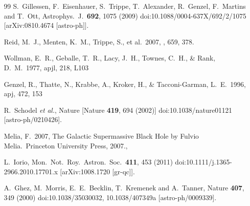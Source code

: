 \documentclass[prd, amsfonts, twocolumn, nofootinbib, showpacs]{revtex4}
\begin{document}
\begin{thebibliography}{99}
  S.~Gillessen, F.~Eisenhauer, S.~Trippe, T.~Alexander, R.~Genzel, F.~Martins and T.~Ott,
  Astrophys.\ J.\  {\bf 692}, 1075 (2009)
  doi:10.1088/0004-637X/692/2/1075
  [arXiv:0810.4674 [astro-ph]].


 Reid, M.~J., Menten, K.~M., Trippe, S., et al.\ 2007, \apj, 659, 378.



 Wollman, E.~R., Geballe, T.~R., Lacy, J.~H., Townes, C.~H., \& Rank, D.~M.\ 1977, apjl, 218, L103


 Genzel, R., Thatte, N., Krabbe, A., Kroker, H., \& Tacconi-Garman, L.~E.\ 1996, apj, 472, 153

  R.~Schodel {\it et al.},
  Nature
  [Nature {\bf 419}, 694 (2002)]
  doi:10.1038/nature01121
  [astro-ph/0210426].

   Melia, F.\ 2007, The Galactic Supermassive Black Hole by Fulvio Melia.~Princeton University Press, 2007.,



  L.~Iorio,
  Mon.\ Not.\ Roy.\ Astron.\ Soc.\  {\bf 411}, 453 (2011)
  doi:10.1111/j.1365-2966.2010.17701.x
  [arXiv:1008.1720 [gr-qc]].




  A.~Ghez, M.~Morris, E.~E.~Becklin, T.~Kremenek and A.~Tanner,
  Nature {\bf 407}, 349 (2000)
  doi:10.1038/35030032, 10.1038/407349a
  [astro-ph/0009339].




\end{thebibliography}
\end{document}
